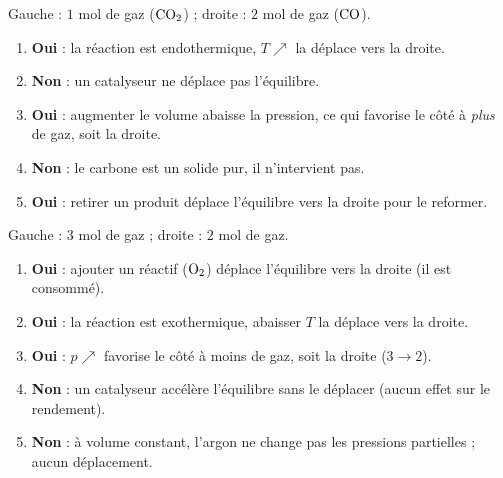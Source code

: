 \documentclass[11pt,a4paper]{article}
\begin{document}
\begin{corrige}
Gauche : $1$ mol de gaz ($\ce{CO2}$) ; droite : $2$ mol de gaz ($\ce{CO}$).
\begin{enumerate}[label=\alph*)]
  \item \textbf{Oui} : la réaction est endothermique, $T\nearrow$ la déplace vers la droite.
  \item \textbf{Non} : un catalyseur ne déplace pas l'équilibre.
  \item \textbf{Oui} : augmenter le volume abaisse la pression, ce qui favorise le côté à \emph{plus} de gaz, soit la droite.
  \item \textbf{Non} : le carbone est un solide pur, il n'intervient pas.
  \item \textbf{Oui} : retirer un produit déplace l'équilibre vers la droite pour le reformer.
\end{enumerate}
\end{corrige}

\begin{corrige}
Gauche : $3$ mol de gaz ; droite : $2$ mol de gaz.
\begin{enumerate}[label=\alph*)]
  \item \textbf{Oui} : ajouter un réactif ($\ce{O2}$) déplace l'équilibre vers la droite (il est consommé).
  \item \textbf{Oui} : la réaction est exothermique, abaisser $T$ la déplace vers la droite.
  \item \textbf{Oui} : $p\nearrow$ favorise le côté à moins de gaz, soit la droite ($3\to 2$).
  \item \textbf{Non} : un catalyseur accélère l'équilibre sans le déplacer (aucun effet sur le rendement).
  \item \textbf{Non} : à volume constant, l'argon ne change pas les pressions partielles ; aucun déplacement.
\end{enumerate}
\end{corrige}
\end{document}
